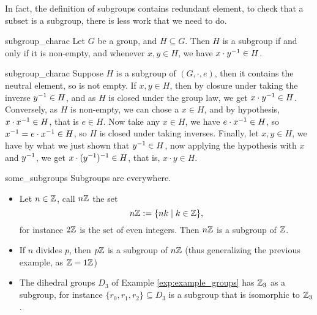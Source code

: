 In fact, the definition of subgroups contains redundant element, to check that a subset is a subgroup, there is less work that we need to do.
\begin{clem}{}{subgroup_charac}
    Let \( G \) be a group, and \( H \subseteq G \). Then \( H \) is a subgroup if and only if it is non-empty, and whenever \( x, y \in H \), we have \( x\cdot y^{-1} \in H \). 
\end{clem}
\begin{lemproof}{subgroup_charac}
    Suppose \( H \) is a subgroup of \( (G, \cdot, e) \), then it contains the neutral element, so is not empty. If \( x, y \in H \), then by closure under taking the inverse \(  y^{-1} \in H \), and as \( H \) is closed under the group law, we get \( x \cdot y^{-1} \in H \). Conversely, as \( H \) is non-empty, we can chose a \( x \in H \), and by hypothesis, \( x \cdot x^{-1} \in H \), that is \( e \in H \). Now take any \( x \in H \), we have \( e \cdot x^{-1} \in H \), so \( x^{-1} = e \cdot x^{-1} \in H \), so \( H \) is closed under taking inverses. Finally, let \( x, y \in H \), we have by what we just shown that \( y^{-1} \in H \), now applying the hypothesis with \( x \) and \( y^{-1} \), we get \( x \cdot (y^{-1})^{-1} \in H \), that is, \( x \cdot y \in H \).
\end{lemproof}

\begin{cexp}{}{some_subgroups}
    Subgroups are everywhere. 
    \begin{itemize}
        \item Let \( n \in \mathbb{Z} \), call \( n\mathbb{Z} \) the set
        \begin{equation*}
            n \mathbb{Z} := \{ nk \mid k \in \mathbb{Z} \},    
        \end{equation*}
        for instance \( 2\mathbb{Z} \) is the set of even integers. Then \( n\mathbb{Z} \) is a subgroup of \( \mathbb{Z} \).
        \item If \( n \) divides \( p \), then \( p\mathbb{Z} \) is a subgroup of \( n\mathbb{Z} \) (thus generalizing the previous example, as \( \mathbb{Z} = 1\mathbb{Z} \))
        \item The dihedral groups \( D_3 \) of Example \ref{exp:example_groups} has \( \mathbb{Z}_3 \) as a subgroup, for instance \( \{ r_0, r_1, r_2 \} \subseteq D_3 \) is a subgroup that is isomorphic to \( \mathbb{Z}_3 \).
    \end{itemize}

\end{cexp}

